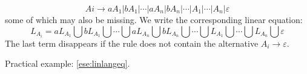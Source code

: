 			$$Ai \longrightarrow a A_1 \vert b A_1 \vert \cdots \vert a A_n \vert b A_n \vert \cdots \vert A_1 \vert \cdots \vert A_n \vert \varepsilon$$
			some of which may also be missing. We write the corresponding linear equation:
			$$L_{A_i} = a L_{A_1} \bigcup b L_{A_1} \bigcup \cdots \bigcup a L_{A_n} \bigcup b L_{A_n} \bigcup \cdots\bigcup L_{A_1} \bigcup \cdots \bigcup 
			L_{A_n} \bigcup \varepsilon$$
			The last term disappears if the rule does not contain the alternative $A_i \rightarrow\varepsilon$.
			
			Practical example: \ref{ese:linlangeq}.